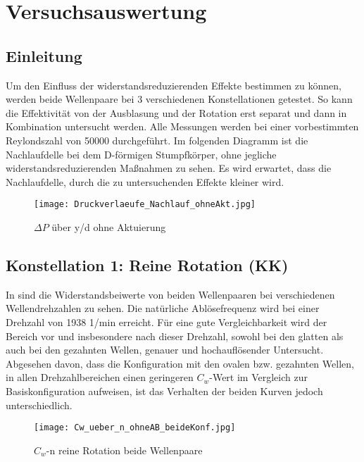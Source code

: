 \chapter{Versuchsauswertung}
\label{s:auswertung}
\section{Einleitung}
\label{s:einleitungAusw}
Um den Einfluss der widerstandsreduzierenden Effekte bestimmen zu k\"onnen, werden beide Wellenpaare bei 3  verschiedenen Konstellationen getestet. So kann die Effektivit\"at von der Ausblasung und der Rotation erst separat und dann in Kombination untersucht werden.
Alle Messungen werden bei einer vorbestimmten Reylondszahl von 50000 durchgef\"uhrt.
Im folgenden Diagramm ist die Nachlaufdelle bei dem D-f\"ormigen Stumpfk\"orper, ohne jegliche widerstandsreduzierenden Ma\ss{}nahmen zu sehen. 
Es wird erwartet, dass die Nachlaufdelle, durch die zu untersuchenden Effekte kleiner wird.
\begin{figure}[h]
	\centering
	\texttt{[image: Druckverlaeufe\_Nachlauf\_ohneAkt.jpg]}
	\caption{ $\Delta P$ \"uber y/d ohne Aktuierung }
	\label{fig:Deltap-y/d_ohne_Aktuation}
\end{figure}

\section{Konstellation 1: Reine Rotation (KK)}
\label{s:ReineRotation}

In   sind die Widerstandsbeiwerte von beiden Wellenpaaren bei verschiedenen Wellendrehzahlen zu sehen.
Die nat\"urliche Abl\"osefrequenz wird bei einer Drehzahl von 1938 1/min  erreicht. F\"ur eine gute Vergleichbarkeit wird der Bereich vor und insbesondere nach dieser Drehzahl, sowohl bei den glatten als auch bei den gezahnten Wellen, genauer und hochaufl\"osender Untersucht.
Abgesehen davon, dass die Konfiguration mit den ovalen bzw. gezahnten Wellen, in allen Drehzahlbereichen einen geringeren $C_{w}$-Wert im Vergleich zur Basiskonfiguration aufweisen, ist das Verhalten der beiden Kurven jedoch unterschiedlich.
\begin{figure}[h]
	\centering
	\texttt{[image: Cw\_ueber\_n\_ohneAB\_beideKonf.jpg]}
	\caption{ $C_{w}$-n reine Rotation beide Wellenpaare }
	\label{fig:Cw-n_Rein_Konf+2}
\end{figure}

